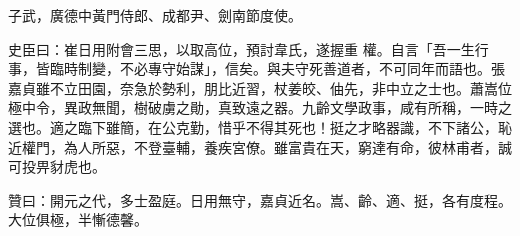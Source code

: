 \begin{pinyinscope}
 子武，廣德中黃門侍郎、成都尹、劍南節度使。



 史臣曰：崔日用附會三思，以取高位，預討韋氏，遂握重
 權。自言「吾一生行事，皆臨時制變，不必專守始謀」，信矣。與夫守死善道者，不可同年而語也。張嘉貞雖不立田園，奈急於勢利，朋比近習，杖姜皎、伷先，非中立之士也。蕭嵩位極中令，異政無聞，樹破虜之勛，真致遠之器。九齡文學政事，咸有所稱，一時之選也。適之臨下雖簡，在公克勤，惜乎不得其死也！挺之才略器識，不下諸公，恥近權門，為人所惡，不登臺輔，養疾宮僚。雖富貴在天，窮達有命，彼林甫者，誠可投畀豺虎也。



 贊曰：開元之代，多士盈庭。日用無守，嘉貞近名。嵩、齡、適、挺，各有度程。大位俱極，半慚德馨。



\end{pinyinscope}